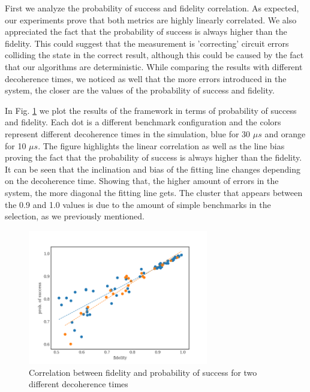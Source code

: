 First we analyze the probability of success and fidelity correlation.
As expected, our experiments prove that both metrics are highly linearly correlated.
We also appreciated the fact that the probability of success is always higher than the fidelity.
This could suggest that the measurement is 'correcting' circuit errors colliding the state in the correct result, although this could be caused by the fact that our algorithms are deterministic.
While comparing the results with different decoherence times, we noticed as well that the more errors introduced in the system, the closer are the values of the probability of success and fidelity.

In Fig. \ref{fig:org1f1e789} we plot the results of the framework in terms of probability of success and fidelity. 
Each dot is a different benchmark configuration and the colors represent different decoherence times in the simulation, blue for 30 \(\mu s\) and orange for 10 \(\mu s\).
The figure highlights the linear correlation as well as the line bias proving the fact that the probability of success is always higher than the fidelity.
It can be seen that the inclination and bias of the fitting line changes depending on the decoherence time.
Showing that, the higher amount of errors in the system, the more diagonal the fitting line gets.
The cluster that appears between the 0.9 and 1.0 values is due to the amount of simple benchmarks in the selection, as we previously mentioned.

\begin{figure}[htbp]
\centering
\includegraphics[width=0.7\textwidth]{figures/f_ps_correlation_with_meas_error.png}
\caption{\label{fig:org1f1e789}
Correlation between fidelity and probability of success for two different decoherence times}
\end{figure}



